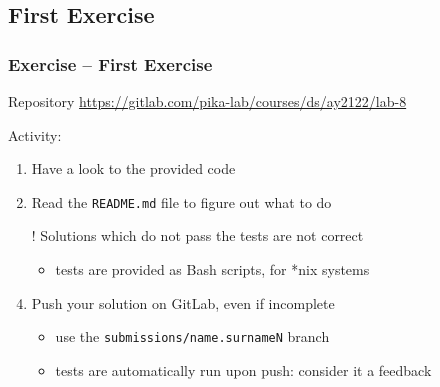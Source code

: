 \documentclass{beamer}\mode<presentation>{\usetheme{AMSBolognaFC}}
\newcommand{\labN}{8}
\newcommand{\labGroup}{https://gitlab.com/pika-lab/courses/ds/ay2122}
\newcommand{\labRepo}{\labGroup/lab-\labN}
\begin{document}
\subsection{First Exercise}

\startExercise

\begin{frame}[allowframebreaks]
	\frametitle{Exercise \currentExercise{} -- First Exercise}

	\begin{block}{Repository}\centering
		\url{\labRepo}
	\end{block}

	\bigskip

	Activity:
	\medskip
	\begin{enumerate}
		\item Have a look to the provided code

		\medskip

		\item Read the \texttt{README.md} file to figure out what to do

		\framebreak

		\item[!] Solutions which do not pass the tests are not correct
		\begin{itemize}
			\item tests are provided as Bash scripts, for *nix systems
		\end{itemize}

		\medskip

		\item Push your solution on GitLab, \alert{even if incomplete}
		\begin{itemize}
			\item use the \texttt{submissions/\alert{name.surnameN}} branch
			\item tests are automatically run upon push: consider it a feedback
		\end{itemize}

	\end{enumerate}

\end{frame}

\section*{}
\frame{\titlepage}
\end{document}
